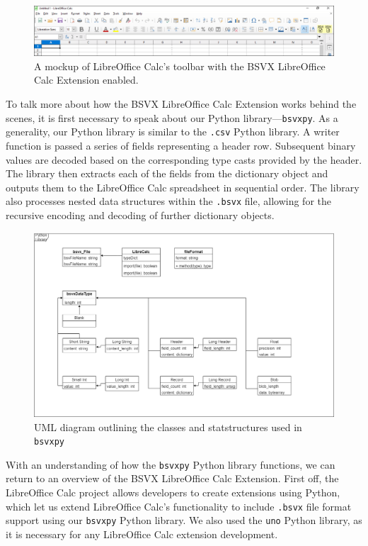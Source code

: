 \documentclass[10pt]{article}
\begin{document}
\begin{figure}[H]
\centering
\includegraphics[width=\textwidth]{figures/mockupPart3.png}
\caption{A mockup of LibreOffice Calc's toolbar with the BSVX LibreOffice Calc Extension enabled.}
\label{fig:deliverables_mockupPart3}
\end{figure}

\indent{}
To talk more about how the BSVX LibreOffice Calc Extension works behind the scenes, it is first necessary to speak about our Python library---\texttt{bsvxpy}.
As a generality, our Python library is similar to the \texttt{.csv} Python library.
A writer function is passed a series of fields representing a header row. 
Subsequent binary values are decoded based on the corresponding type casts provided by the header.
The library then extracts each of the fields from the dictionary object and outputs them to the LibreOffice Calc spreadsheet in sequential order.
The library also processes nested data structures within the \texttt{.bsvx} file, allowing for the recursive encoding and decoding of further dictionary objects.

\begin{figure}[H]
\centering
\includegraphics[width=\textwidth]{figures/bsvxpy.png}
\caption{UML diagram outlining the classes and statstructures used in \texttt{bsvxpy}}
\label{fig:bsvxpy_architecture}
\end{figure}

\indent{}
With an understanding of how the \texttt{bsvxpy} Python library functions, we can return to an overview of the BSVX LibreOffice Calc Extension.
First off, the LibreOffice Calc project allows developers to create extensions using Python, which let us extend LibreOffice Calc’s functionality to include \texttt{.bsvx} file format support using our \texttt{bsvxpy} Python library.
We also used the \texttt{uno} Python library, as it is necessary for any LibreOffice Calc extension development.
\end{document}
